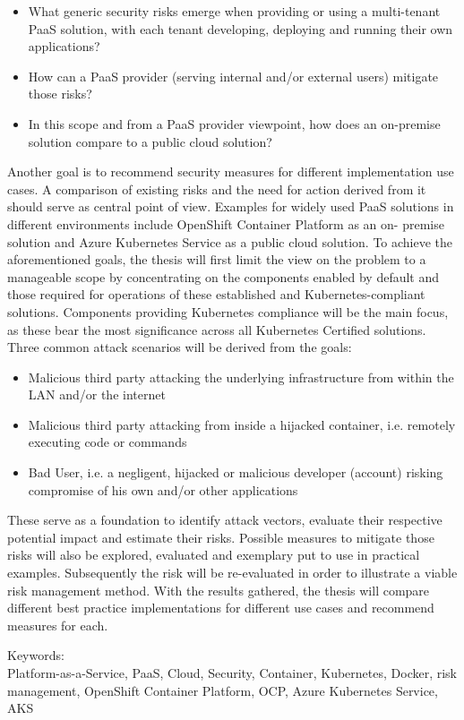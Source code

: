 \begin{itemize}

\item What generic security risks emerge when providing or using a multi-tenant PaaS solution,
with each tenant developing, deploying and running their own applications? 

\item How can a PaaS provider (serving internal and/or external users) mitigate those risks? 

\item  In this scope and from a PaaS provider viewpoint, how does an on-premise solution compare
to a public cloud solution? 

\end{itemize}

Another goal is to recommend security measures for different implementation use cases.
A comparison of existing risks and the need for action derived from it should serve as central point of view.
Examples for widely used PaaS solutions in different environments include OpenShift Container Platform 
as an on- premise solution and Azure Kubernetes Service as a public cloud solution.
To achieve the aforementioned goals, the thesis will first limit the view on the problem to a manageable scope by
concentrating on the components enabled by default and those required for operations of these established and Kubernetes-compliant solutions.
Components providing Kubernetes compliance will be the main focus, as these bear the most significance across all Kubernetes Certified solutions. 
Three common attack scenarios will be derived from the goals:

\begin{itemize}

\item Malicious third party attacking the underlying infrastructure from within the LAN and/or the
internet

\item Malicious third party attacking from inside a hijacked container, i.e. remotely executing code
or commands

\item Bad User, i.e. a negligent, hijacked or malicious developer (account) risking compromise of
his own and/or other applications

\end{itemize}

These serve as a foundation to identify attack vectors, evaluate their respective potential impact and estimate their risks.
Possible measures to mitigate those risks will also be explored, evaluated and exemplary put to use in practical examples.
Subsequently the risk will be re-evaluated in order to illustrate a viable risk management method.
With the results gathered, the thesis will compare different best practice implementations for different use cases and recommend measures for each.

\bigskip

\noindent
Keywords: \\
Platform-as-a-Service, PaaS, Cloud, Security, Container, Kubernetes, Docker, risk management, OpenShift Container Platform, OCP, Azure Kubernetes Service, AKS

